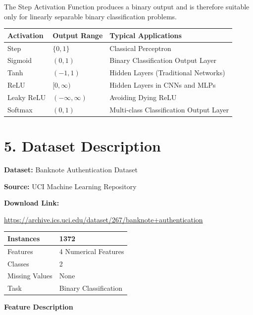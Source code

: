 \documentclass[11pt]{article}
\begin{document}
The Step Activation Function produces a binary output and is therefore suitable only for linearly separable binary classification problems.

\begin{center}
\begin{tabular}{|p{2.5cm}|p{3cm}|p{6cm}|}
\hline
\textbf{Activation} & \textbf{Output Range} & \textbf{Typical Applications}\\
\hline
Step & $\{0,1\}$ & Classical Perceptron\\
\hline
Sigmoid & $(0,1)$ & Binary Classification Output Layer\\
\hline
Tanh & $(-1,1)$ & Hidden Layers (Traditional Networks)\\
\hline
ReLU & $[0,\infty)$ & Hidden Layers in CNNs and MLPs\\
\hline
Leaky ReLU & $(-\infty,\infty)$ & Avoiding Dying ReLU\\
\hline
Softmax & $(0,1)$ & Multi-class Classification Output Layer\\
\hline
\end{tabular}
\end{center}



\section*{5. Dataset Description}

\textbf{Dataset:} Banknote Authentication Dataset

\textbf{Source:} UCI Machine Learning Repository

\textbf{Download Link:}

\url{https://archive.ics.uci.edu/dataset/267/banknote+authentication}

\begin{center}
\begin{tabular}{|l|l|}
\hline
Instances & 1372\\
\hline
Features & 4 Numerical Features\\
\hline
Classes & 2\\
\hline
Missing Values & None\\
\hline
Task & Binary Classification\\
\hline
\end{tabular}
\end{center}

\textbf{Feature Description}
\end{document}
